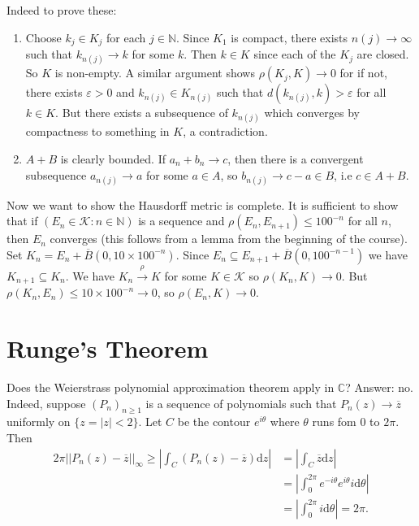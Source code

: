 \documentclass[a4paper, 10pt, twocolumn]{amsart}
\theoremstyle{definition}
\newcommand{\bb}[1]{\mathbb{#1}}
\newcommand{\eps}[0]{\varepsilon}
\newcommand{\sbs}[0]{\subseteq}
\renewcommand{\cal}[1]{\mathcal{#1}}
\newcommand{\too}{\xrightarrow}
\newcommand{\1}{\mathbbm{1}}
\begin{document}
Indeed to prove these: 
\begin{enumerate}
    \item Choose $k_j \in K_j$ for each $j \in \bb{N}$. Since $K_1$ is compact, there exists $n(j) \to \infty$ such that $k_{n(j)} \to k$ for some $k$. Then $k \in K$ since each of the $K_j$ are closed. So $K$ is non-empty. A similar argument shows $\rho(K_j,K) \to 0$ for if not, there exists $\eps>0$ and $k_{n(j)} \in K_{n(j)}$ such that $d(k_{n(j)},k)>\eps$ for all $k \in K$. But there exists a subsequence of $k_{n(j)}$ which converges by compactness to something in $K$, a contradiction.
    \item $A+B$ is clearly bounded. If $a_n+b_n \to c$, then there is a convergent subsequence $a_{n(j)} \to a$ for some $a \in A$, so $b_{n(j)} \to c-a \in B$, i.e $c \in A+B$. 
\end{enumerate}

Now we want to show the Hausdorff metric is complete. It is sufficient to show that if $(E_n \in \cal{K}:n \in \bb{N})$ is a sequence and $\rho(E_n,E_{n+1}) \le 100^{-n}$ for all $n$, then $E_n$ converges (this follows from a lemma from the beginning of the course). \\

Set $K_n = E_n + \overline{B}(0,10\times 100^{-n})$. Since $E_n \sbs E_{n+1} + \overline{B}(0,100^{-n-1})$ we have $K_{n+1}\sbs K_n$. We have $K_n \too{\rho} K$ for some $K \in \cal{K}$ so $\rho(K_n,K) \to 0$. But $\rho(K_n,E_n) \le 10 \times 100^{-n} \to 0$, so $\rho(E_n,K) \to 0$. \\





\section{Runge's Theorem}

Does the Weierstrass polynomial approximation theorem apply in $\bb{C}$? Answer: no.\\

Indeed, suppose $(P_n)_{n\ge 1}$ is a sequence of polynomials such that $P_n(z) \to \overline{z}$ uniformly on $\{z =|z| < 2\}$. Let $C$ be the contour $e^{i\theta}$ where $\theta$ runs fom $0$ to $2\pi$. Then \begin{align*}
    2\pi ||P_n(z)-\overline{z}||_\infty \ge \left| \int_C (P_n(z)-\overline{z})\mathrm{d}z\right| &= \left|\int_C \overline{z}\mathrm{d}z\right|\\
    & = \left| \int_{0}^{2\pi} e^{-i\theta} e^{i\theta}i\mathrm{d}\theta \right|\\
    &= \left|\int_{0}^{2\pi} i \mathrm{d}\theta\right| = 2\pi.
\end{align*}
\end{document}
